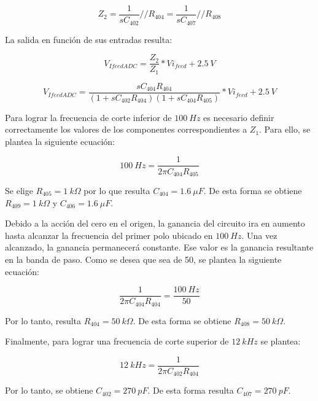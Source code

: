 \begin{equation*} 
	Z_2=\frac{1}{sC_{402}}//R_{404}=\frac{1}{sC_{407}}//R_{408}
\end{equation*}

La salida en función de sus entradas resulta:

\begin{equation*} 
	V_{IfeedADC} =\frac{Z_2}{Z_1}*Vi_{feed}+2.5\:V
\end{equation*}

\begin{equation*} 
	V_{IfeedADC} =\frac{sC_{404}R_{404}}{(1+sC_{402}R_{404})(1+sC_{404}R_{405})}*Vi_{feed}+2.5\:V
\end{equation*}

Para lograr la frecuencia de corte inferior de $100\:Hz$ es necesario definir correctamente los valores de los componentes correspondientes a $Z_1$. Para ello, se plantea la siguiente ecuación:

\begin{equation*} 
	100\:Hz=\frac{1}{2\pi C_{404}R_{405}}
\end{equation*}

Se elige $R_{405}=1\:k\Omega$ por lo que resulta $C_{404}=1.6\:\mu F$. De esta forma se obtiene $R_{409}=1\:k\Omega$ y $C_{406}=1.6\:\mu F$.

Debido a la acción del cero en el origen, la ganancia del circuito ira en aumento hasta alcanzar la frecuencia del primer polo ubicado en $100\:Hz$. Una vez alcanzado, la ganancia permanecerá constante. Ese valor es la ganancia resultante en la banda de paso. Como se desea que sea de 50, se plantea la siguiente ecuación:

\begin{equation*} 
	\frac{1}{2\pi C_{404}R_{404}}=\frac{100\:Hz}{50}
\end{equation*}

Por lo tanto, resulta $R_{404}=50\:k\Omega$. De esta forma se obtiene $R_{408}=50\:k\Omega$.

Finalmente, para lograr una frecuencia de corte superior de $12\:kHz$ se plantea:

\begin{equation*} 
	12\:kHz=\frac{1}{2\pi C_{402}R_{404}}
\end{equation*}

Por lo tanto, se obtiene $C_{402}=270\:pF$. De esta forma resulta $C_{407}=270\:pF$.



